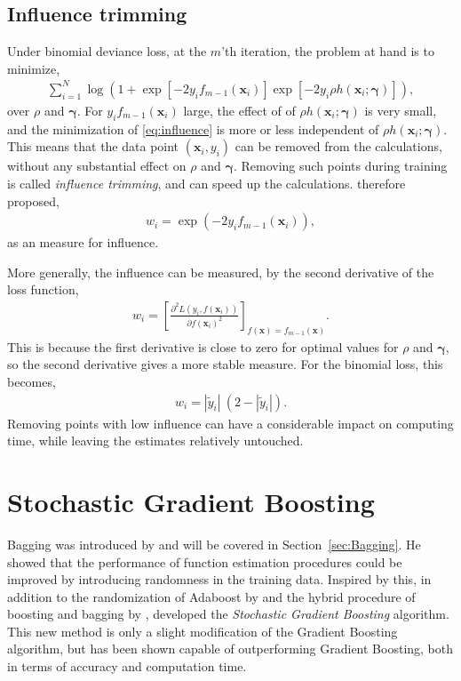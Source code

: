 \subsection{Influence trimming}
\label{sub:Influence trimming}
Under binomial deviance loss, at the $m$'th iteration, the problem at hand is to minimize,
\begin{align}
  \label{eq:influence} 
  \sum_{i = 1}^{N} \log \left( 1 + \exp[ -2 y_i f_{m-1}(\mathbf{x}_i)] \exp [-2 y_i \rho h(\mathbf{x}_i; \bm \gamma)] \right),
\end{align}
over $\rho$ and $\bm \gamma$.  For $y_i f_{m-1}(\mathbf{x}_i)$ large, the effect of of $\rho h(\mathbf{x}_i; \bm{\gamma})$ is very small, and the minimization of \eqref{eq:influence} is more or less independent of $\rho h(\mathbf{x}_i; \bm \gamma)$. This means that the data point $(\mathbf{x}_i, y_i)$ can be removed from the calculations, without any substantial effect on $\rho$ and $\bm \gamma$. Removing such points during training is called \textit{influence trimming}, and can speed up the calculations. \cite{friedman} therefore proposed,
\begin{align}
  w_i = \exp (- 2 y_i f_{m-1}(\mathbf{x}_i)), 
\end{align}
as an measure for influence. 

More generally, the influence can be measured, by the second derivative of the loss function,
\begin{align}
  w_i = \left[ \frac{\partial^2 L(y_i, f(\mathbf{x}_i)) }{\partial f(\mathbf{x}_i)^2}  \right]_{f(\mathbf{x}) = f_{m-1}(\mathbf{x})}.
\end{align}
This is because the first derivative is close to zero for optimal values for $\rho$ and $\bm \gamma$, so the second derivative gives a more stable measure.  For the binomial loss, this becomes,
\begin{align}
  w_i = |\tilde y_i| \: (2 - |\tilde y_i|). 
\end{align}
Removing points with low influence can have a considerable impact on computing time, while leaving the estimates relatively untouched. 

\section{Stochastic Gradient Boosting}
\label{sec:Stochastic Gradient Boosting}
Bagging was introduced by \cite{Breiman1996} and will be covered in Section~\ref{sec:Bagging}. He showed that the performance of function estimation procedures could be improved by introducing randomness in the training data. 
Inspired by this, in addition to the randomization of Adaboost by \cite{freund1996} and the hybrid procedure of boosting and bagging by \cite{breiman1999}, \cite{FriedmanStochBoost} developed the \textit{Stochastic Gradient Boosting} algorithm.
This new method is only a slight modification of the Gradient Boosting algorithm, but has been shown capable of outperforming Gradient Boosting, both in terms of accuracy and computation time.  

